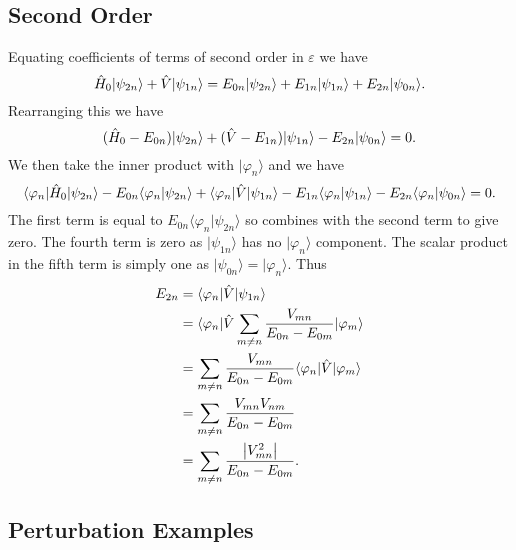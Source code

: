 \documentclass[a4paper]{article}
\renewcommand{\ket}[1]{\vert {#1} \rangle}
\renewcommand{\bra}[1]{\langle {#1} \vert}
\renewcommand{\braket}[2]{\langle {#1} \vert {#2} \rangle}
\theoremstyle{definition}
\begin{document}
    \subsection{Second Order}
    Equating coefficients of terms of second order in \(\varepsilon\) we have
    \[\operator{H}_0\ket{\psi_{2n}} + \operator{V}\ket{\psi_{1n}} = E_{0n}\ket{\psi_{2n}} + E_{1n}\ket{\psi_{1n}} + E_{2n}\ket{\psi_{0n}}.\]
    Rearranging this we have
    \[(\operator{H}_0 - E_{0n})\ket{\psi_{2n}} + (\operator{V} - E_{1n})\ket{\psi_{1n}} - E_{2n}\ket{\psi_{0n}} = 0.\]
    We then take the inner product with \(\ket{\varphi_n}\) and we have
    \[\bra{\varphi_n}\operator{H}_{0}\ket{\psi_{2n}} - E_{0n}\braket{\varphi_n}{\psi_{2n}} + \bra{\varphi_n}\operator{V}\ket{\psi_{1n}} - E_{1n}\braket{\varphi_n}{\psi_{1n}} - E_{2n}\braket{\varphi_n}{\psi_{0n}} = 0.\]
    The first term is equal to \(E_{0n}\braket{\varphi_n}{\psi_{2n}}\) so combines with the second term to give zero.
    The fourth term is zero as \(\ket{\psi_{1n}}\) has no \(\ket{\varphi_n}\) component.
    The scalar product in the fifth term is simply one as \(\ket{\psi_{0n}} = \ket{\varphi_n}\).
    Thus
    \begin{align*}
        E_{2n} &= \bra{\varphi_n}\operator{V}\ket{\psi_{1n}}\\
        &= \bra{\varphi_n}\operator{V}\sum_{m\ne n} \frac{V_{mn}}{E_{0n} - E_{0m}}\ket{\varphi_m}\\
        &= \sum_{m\ne n}\frac{V_{mn}}{E_{0n} - E_{0m}}\bra{\varphi_n} \operator{V}\ket{\varphi_m}\\
        &= \sum_{m\ne n}\frac{V_{mn}V_{nm}}{E_{0n} - E_{0m}}\\
        &= \sum_{m\ne n}\frac{\abs{V_{mn}^2}}{E_{0n} - E_{0m}}.
    \end{align*}

    \subsection{Perturbation Examples}
\end{document}
